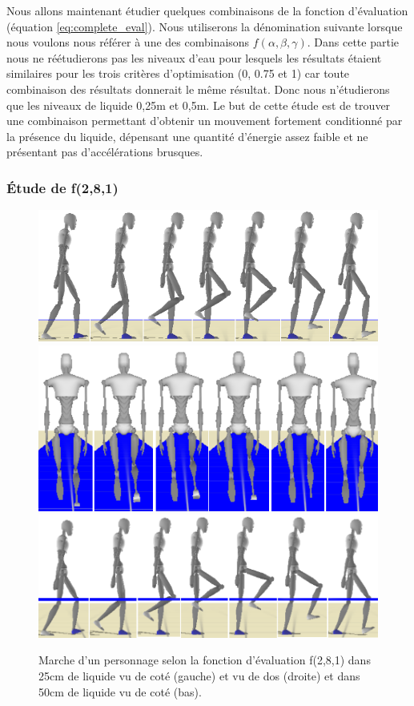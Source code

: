 \documentclass[runningheads,a4paper]{llncs}
\begin{document}
Nous allons maintenant étudier quelques combinaisons de la fonction d'évaluation (équation \ref{eq:complete_eval}). Nous utiliserons la dénomination suivante lorsque nous voulons nous référer à une des combinaisons $f(\alpha,\beta,\gamma)$. Dans cette partie nous ne réétudierons pas les niveaux d'eau pour lesquels les résultats étaient similaires pour les trois critères d'optimisation (0, 0.75 et 1) car toute combinaison des résultats donnerait le même résultat. Donc nous n'étudierons que les niveaux de liquide 0,25m et 0,5m. Le but de cette étude est de trouver une combinaison permettant d'obtenir un mouvement fortement conditionné par la présence du liquide, dépensant une quantité d'énergie assez faible et ne présentant pas d'accélérations brusques. 

\subsubsection{Étude de f(2,8,1)}

\begin{figure}[h]
\centering
\includegraphics[scale=0.35]{strips/2_8_1_25cm.png}
\includegraphics[scale=0.35]{strips/2_8_1_25cm_from_back.png}
\includegraphics[scale=0.4]{strips/2_8_1_50cm.png}
\caption{Marche d'un personnage selon la fonction d'évaluation f(2,8,1) dans 25cm de liquide vu de coté (gauche) et vu de dos (droite) et dans 50cm de liquide vu de coté (bas). }
\label{fig:f281}
\end{figure}
\end{document}
